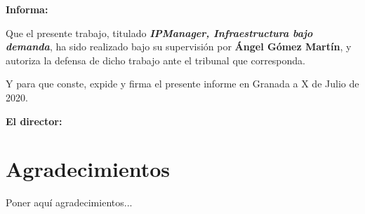 \vspace{0.5cm}

\textbf{Informa:}

\vspace{0.5cm}

Que el presente trabajo, titulado \textit{\textbf{IPManager, Infraestructura bajo demanda}},
ha sido realizado bajo su supervisión por \textbf{Ángel Gómez Martín}, y autoriza la defensa de dicho trabajo ante el tribunal que corresponda.

\vspace{0.5cm}

Y para que conste, expide y firma el presente informe en Granada a X de Julio de 2020.

\vspace{1cm}

\textbf{El director:}

\vspace{5cm}









\chapter*{Agradecimientos}
\thispagestyle{empty}

       \vspace{1cm}


Poner aquí agradecimientos...

